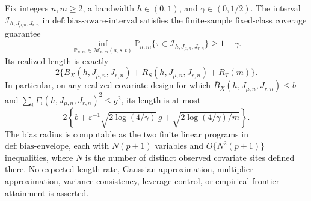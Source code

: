 Fix integers \(n,m\ge2\), a bandwidth \(h\in(0,1)\), and \(\gamma\in(0,1/2)\). The interval \(\mathcal I_{h,J_{\mu,n},J_{r,n}}\) in \(\mathrm{def:bias\text{-}aware\text{-}interval}\) satisfies the finite-sample fixed-class coverage guarantee
\[
\inf_{\mathbb P_{n,m}\in\mathcal M_{n,m}(a,s,t)}
\mathbb P_{n,m}\{\tau\in\mathcal I_{h,J_{\mu,n},J_{r,n}}\}\ge1-\gamma.
\]
Its realized length is exactly
\[
2\{\overline B_X(h,J_{\mu,n},J_{r,n})+R_S(h,J_{\mu,n},J_{r,n})+R_T(m)\}.
\]
In particular, on any realized covariate design for which \(\overline B_X(h,J_{\mu,n},J_{r,n})\le b\) and \(\sum_i\Gamma_i(h,J_{\mu,n},J_{r,n})^2\le g^2\), its length is at most
\[
2\left\{b+\varepsilon^{-1}\sqrt{2\log(4/\gamma)}\,g+\sqrt{2\log(4/\gamma)/m}\right\}.
\]
The bias radius is computable as the two finite linear programs in \(\mathrm{def:bias\text{-}envelope}\), each with \(N(p+1)\) variables and \(O\{N^2(p+1)\}\) inequalities, where \(N\) is the number of distinct observed covariate sites defined there. No expected-length rate, Gaussian approximation, multiplier approximation, variance consistency, leverage control, or empirical frontier attainment is asserted.